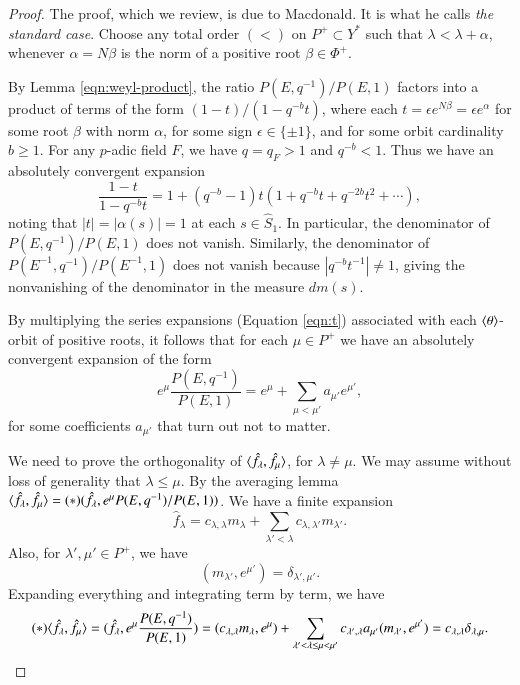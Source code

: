 \begin{proof}  
The proof, which we review, is due to Macdonald.
It is what he calls {\it the standard case}.  
Choose any total order $(<)$ on $P^+\subset Y^*$ such that 
$\lambda < \lambda + \alpha$, whenever $\alpha = N\beta$ is the norm of a positive root $\beta\in\Phi^+$.

By Lemma \ref{eqn:weyl-product},
the ratio $P(E,q^{-1})/P(E,1)$  factors into a product of terms of the form $(1- t)/(1- q^{-b} t)$, 
where each $t = \epsilon e^{N\beta} = \epsilon e^\alpha$ for
some root $\beta$ with norm $\alpha$, 
for some sign $\epsilon\in \{\pm 1\}$, and for some orbit cardinality $b\ge 1$.
For any $p$-adic field $F$, we have $q = q_F > 1$ and $q^{-b} < 1$.  Thus we have an absolutely convergent 
expansion
\begin{equation}\label{eqn:t}
\frac{1- t}{1- q^{-b} t} = 1 + (q^{-b}-1) t (1+ q^{-b} t + q^{-2b} t^2 + \cdots),
\end{equation}
noting that $|t| = |\alpha(s)|=1$ at each $s\in \hat S_1$.  In particular, the denominator of $P(E,q^{-1})/P(E,1)$ does not
vanish.  Similarly, the
denominator of $P(E^{-1},q^{-1})/P(E^{-1},1)$ does not vanish because $|q^{-b} t^{-1}|\ne1$, giving the nonvanishing of the
denominator in the measure $dm(s)$.

By multiplying the series expansions (Equation \ref{eqn:t}) associated with each $\langle{\theta}\rangle$-orbit of positive roots,
it follows that for each $\mu\in P^+$ we have an absolutely convergent expansion of the form
\[
e^\mu \frac{P(E,q^{-1})}{P(E,1)} = e^\mu +\sum_{\mu< \mu'} a_{\mu'} e^{\mu'},
\] 
for some coefficients $a_{\mu'}$ that turn out not to matter.

We need to prove the orthogonality of $\langle{\hat f_\lambda,\hat f_\mu}\rangle$, for $\lambda\ne\mu$.  
We may assume without loss of generality that $\lambda \le \mu$.
By the averaging lemma $\langle{\hat f_\lambda,\hat f_\mu}\rangle = (*) (\hat f_\lambda,e^\mu P(E,q^{-1})/P(E,1))$.
We have a finite expansion
\[
\hat f_\lambda = c_{\lambda,\lambda} m_\lambda + \sum_{\lambda' <\lambda } c_{\lambda,\lambda'} m_{\lambda'}.
\]
Also, for $\lambda',\mu'\in P^+$, we have
\[
(m_{\lambda'},e^{\mu'}) = \delta_{\lambda',{\mu'}}.
\]
Expanding everything and integrating term by term, we have
\[
(*)\langle{\hat f_\lambda,\hat f_\mu}\rangle = (\hat f_\lambda, e^\mu \frac{ P(E,q^{-1})}{P(E,1)}) = (c_{\lambda,\lambda} m_\lambda,e^\mu) + \sum_{\lambda' < \lambda\le\mu < \mu'}
c_{\lambda',\lambda} a_{\mu'} (m_{\lambda'},e^{\mu'}) = c_{\lambda,\lambda} \delta_{\lambda,\mu}.
\]
\end{proof}



